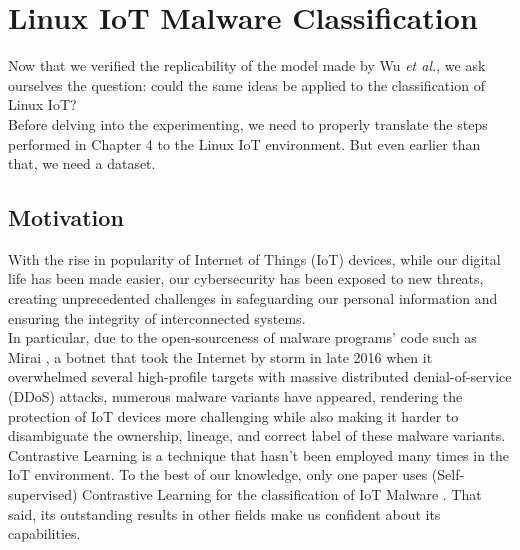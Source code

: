 \chapter{Linux IoT Malware Classification}
\thispagestyle{chapterfancy}


Now that we verified the replicability of the model made by Wu \textit{et al.}, we ask ourselves the question: could the same ideas be applied to the classification of Linux IoT? \\
Before delving into the experimenting, we need to properly translate the steps performed in Chapter 4 to the Linux IoT environment. But even earlier than that, we need a dataset.

\section{Motivation}
With the rise in popularity of Internet of Things (IoT) devices, while our digital life has been made easier, our cybersecurity has been exposed to new threats, creating unprecedented challenges in safeguarding our personal information and ensuring the integrity of interconnected systems. \\
In particular, due to the open-sourceness of malware programs' code such as Mirai \cite{antonakakis2017understanding}, a botnet that took the Internet by storm in late 2016 when it overwhelmed several high-profile targets with massive distributed denial-of-service (DDoS) attacks, numerous malware variants have appeared, rendering the protection of IoT devices more challenging while also making it harder to disambiguate the ownership, lineage, and correct label of these malware variants. \\
Contrastive Learning is a technique that hasn't been employed many times in the IoT environment. To the best of our knowledge, only one paper uses (Self-supervised) Contrastive Learning for the classification of IoT Malware \cite{dib2022evoliot}. That said, its outstanding results in other fields make us confident about its capabilities. 

